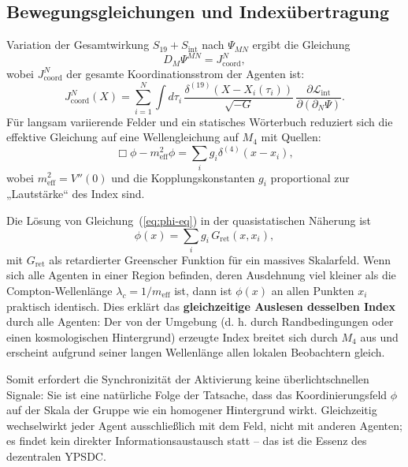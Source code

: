 \documentclass[12pt,a4paper]{article}
\begin{document}
	\subsection{Bewegungsgleichungen und Indexübertragung}
	
	Variation der Gesamtwirkung \(S_{19} + S_{\mathrm{int}}\) nach \(\Psi_{MN}\) ergibt die Gleichung
	\begin{equation}
		D_M \Psi^{MN} = J^{N}_{\mathrm{coord}},
		\label{eq:Psi-eq}
	\end{equation}
	wobei \(J^{N}_{\mathrm{coord}}\) der gesamte Koordinationsstrom der Agenten ist:
	\begin{equation}
		J^{N}_{\mathrm{coord}}(X) = \sum_{i=1}^{N} \int d\tau_i\, \frac{\delta^{(19)}(X - X_i(\tau_i))}{\sqrt{-G}}\, \frac{\partial \mathcal{L}_{\mathrm{int}}}{\partial (\partial_N \Psi)}.
	\end{equation}
	Für langsam variierende Felder und ein statisches Wörterbuch reduziert sich die effektive Gleichung auf eine Wellengleichung auf \(M_4\) mit Quellen:
	\begin{equation}
		\Box \phi - m_{\mathrm{eff}}^2 \phi = \sum_{i} g_i \delta^{(4)}(x - x_i),
		\label{eq:phi-eq}
	\end{equation}
	wobei \(m_{\mathrm{eff}}^2 = V''(0)\) und die Kopplungskonstanten \(g_i\) proportional zur „Lautstärke“ des Index sind.
	
	Die Lösung von Gleichung~(\ref{eq:phi-eq}) in der quasistatischen Näherung ist
	\begin{equation}
		\phi(x) = \sum_i g_i \, G_{\mathrm{ret}}(x, x_i),
	\end{equation}
	mit \(G_{\mathrm{ret}}\) als retardierter Greenscher Funktion für ein massives Skalarfeld. Wenn sich alle Agenten in einer Region befinden, deren Ausdehnung viel kleiner als die Compton‑Wellenlänge \(\lambda_c = 1/m_{\mathrm{eff}}\) ist, dann ist \(\phi(x)\) an allen Punkten \(x_i\) praktisch identisch. Dies erklärt das \textbf{gleichzeitige Auslesen desselben Index} durch alle Agenten: Der von der Umgebung (d. h. durch Randbedingungen oder einen kosmologischen Hintergrund) erzeugte Index breitet sich durch \(M_4\) aus und erscheint aufgrund seiner langen Wellenlänge allen lokalen Beobachtern gleich.
	
	Somit erfordert die Synchronizität der Aktivierung keine überlichtschnellen Signale: Sie ist eine natürliche Folge der Tatsache, dass das Koordinierungsfeld \(\phi\) auf der Skala der Gruppe wie ein homogener Hintergrund wirkt. Gleichzeitig wechselwirkt jeder Agent ausschließlich mit dem Feld, nicht mit anderen Agenten; es findet kein direkter Informationsaustausch statt – das ist die Essenz des dezentralen YPSDC.
	
\end{document}
